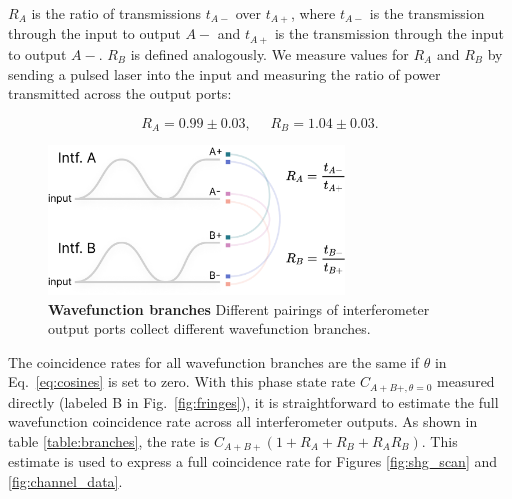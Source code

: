 \documentclass[11pt]{caltech_thesis} %
\begin{document}
$R_A$ is the ratio of transmissions $t_{A-}$ over $t_{A+}$, where $t_{A-}$ is the transmission through the input to output $A-$ and $t_{A+}$ is the transmission through the input to output $A-$. $R_B$ is defined analogously. We measure values for $R_A$ and $R_B$ by sending a pulsed laser into the input and measuring the ratio of power transmitted across the output ports:

$$R_A = 0.99 \pm 0.03, ~~~~~~ R_B = 1.04 \pm 0.03.$$

\hypertarget{fig:branches}{%
\begin{figure}
\centering
\includegraphics[width=0.7\textwidth,height=\textheight]{./chapter_05/figs/branches_light.pdf}
\caption[{Wavefunction branches}]{\textbf{Wavefunction branches} Different pairings of interferometer output ports collect different wavefunction branches.}
\label{fig:branches}
\end{figure}
}

The coincidence rates for all wavefunction branches are the same if $\theta$ in Eq.~\ref{eq:cosines} is set to zero. With this phase state rate $C_{A+ B+, \theta=0}$ measured directly (labeled B in Fig.~\ref{fig:fringes}), it is straightforward to estimate the full wavefunction coincidence rate across all interferometer outputs. As shown in table \ref{table:branches}, the rate is $C_{A+ B+}(1 + R_A + R_B + R_AR_B)$. This estimate is used to express a full coincidence rate for Figures \ref{fig:shg_scan} and \ref{fig:channel_data}.
\end{document}
